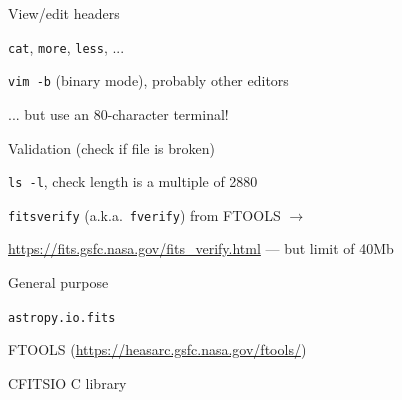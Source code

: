 \documentclass[20pt,landscape]{foils}
\newcommand{\burl}[1]{{\color{blue}\url{#1}}}
\begin{document}
\begin{list1}
\vspace*{-0.2cm}
  \item View/edit headers
\vspace*{-0.2cm}
  \begin{list2}
\vspace*{-0.1cm}
    \item {\color{brown}\tt cat},
          {\color{brown}\tt more},
          {\color{brown}\tt less}, ...
\vspace*{-0.1cm}
    \item {\color{brown}\tt vim -b} (binary mode), probably other editors
\vspace*{-0.1cm}
    \item[] \hspace*{1em} ... but use an 80-character terminal!
  \end{list2}
\vspace*{-0.2cm}
  \item Validation (check if file is broken)
\vspace*{-0.2cm}
  \begin{list2}
\vspace*{-0.1cm}
    \item {\color{brown}\tt ls -l}, check length is a multiple of 2880
\vspace*{-0.1cm}
    \item {\color{brown}\tt fitsverify} (a.k.a.\ {\color{brown}\tt fverify})
          from FTOOLS
          \hspace*{2em} {\color{darkgrey}$\longrightarrow$}
\vspace*{-0.1cm}
    \item \burl{https://fits.gsfc.nasa.gov/fits_verify.html}
          --- but limit of 40Mb
  \end{list2}
\vspace*{-0.2cm}
  \item General purpose
\vspace*{-0.2cm}
  \begin{list2}
\vspace*{-0.1cm}
    \item {\tt astropy.io.fits}
\vspace*{-0.1cm}
    \item FTOOLS (\burl{https://heasarc.gsfc.nasa.gov/ftools/})
\vspace*{-0.1cm}
    \item CFITSIO C library
  \end{list2}
\vspace*{-0.2cm}

\end{list1}
\end{document}
